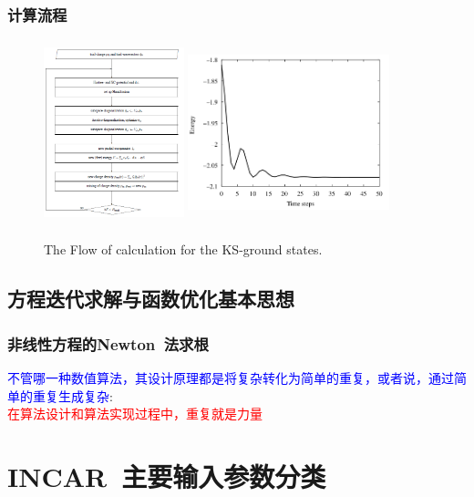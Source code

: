 \documentclass[cjk,slidestop,compress,mathserif,blue]{beamer}
\begin{document}
\frame
{
	\frametitle{计算流程}
\begin{figure}[h!]
	\vspace{-0.2in}
\centering
\includegraphics[height=2.1in,width=1.6in,viewport=0 0 480 630,clip]{Figures/VASP_procedure.png}
\includegraphics[height=2.1in,width=2.3in,viewport=0 0 740 600,clip]{Figures/Ab-initio-Ene.png}
\caption{\small \textrm{The Flow of calculation for the KS-ground states.}}%
\label{PAW_baiseset}
\end{figure} 
}

\subsection{方程迭代求解与函数优化基本思想}
\frame
{
	\frametitle{非线性方程的\rm{Newton~}法求根}
	\textcolor{blue}{不管哪一种数值算法，其设计原理都是将复杂转化为简单的重复，或者说，通过简单的重复生成复杂}:\\\textcolor{red}{在算法设计和算法实现过程中，重复就是力量}
\begin{figure}[h!]
\centering
{}
\label{Equation_Newon}
\end{figure}
}

\section{\rm{INCAR}~主要输入参数分类}
\end{document}
